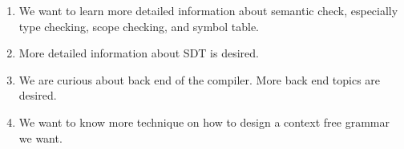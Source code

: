 \begin{enumerate}
\item
We want to learn more detailed information about semantic check, especially type
checking, scope checking, and symbol table.
\item
More detailed information about SDT is desired.
\item
We are curious about back end of the compiler. More back end topics are desired.
\item
We want to know more technique on how to design a context free grammar we want.
\end{enumerate}
